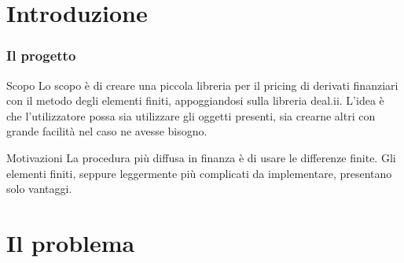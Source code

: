 \documentclass{beamer}
\begin{document}
\section{Introduzione}
\begin{frame}
\frametitle{Il progetto}
\begin{block}{Scopo}
Lo scopo è di creare una piccola libreria per il pricing di derivati finanziari con il metodo degli elementi finiti, appoggiandosi sulla libreria \textsf{deal.ii}.
L'idea è che l'utilizzatore possa sia utilizzare gli oggetti presenti, sia crearne altri con grande facilità nel caso ne avesse bisogno.
\end{block}
\pause
\begin{block}{Motivazioni}
La procedura pi\`u diffusa in finanza è di usare le differenze finite. Gli elementi finiti, seppure leggermente pi\`u complicati da implementare, presentano solo vantaggi.
\end{block}
\end{frame}

\section{Il problema}
\end{document}
